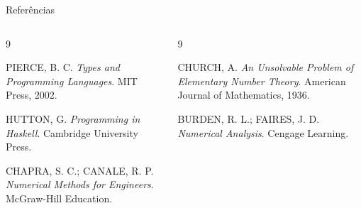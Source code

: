 \documentclass[aspectratio=169,11pt]{beamer}
\begin{document}
\begin{frame}{Referências}

  \scriptsize

  \begin{columns}[T,onlytextwidth]


    \begin{thebibliography}{9}

      PIERCE, B. C.
      \newblock \emph{Types and Programming Languages}.
      \newblock MIT Press, 2002.

      HUTTON, G.
      \newblock \emph{Programming in Haskell}.
      \newblock Cambridge University Press.

      CHAPRA, S. C.; CANALE, R. P.
      \newblock \emph{Numerical Methods for Engineers}.
      \newblock McGraw-Hill Education.

    \end{thebibliography}


    \begin{thebibliography}{9}

      \setcounter{enumiv}{3}

      CHURCH, A.
      \newblock \emph{An Unsolvable Problem of Elementary Number Theory}.
      \newblock American Journal of Mathematics, 1936.

      BURDEN, R. L.; FAIRES, J. D.
      \newblock \emph{Numerical Analysis}.
      \newblock Cengage Learning.

    \end{thebibliography}

  \end{columns}

\end{frame}
\end{document}
